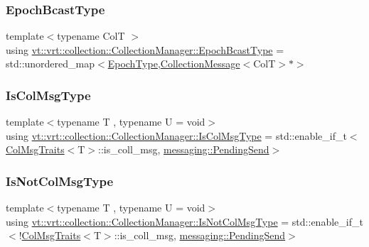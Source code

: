 \subsubsection{\texorpdfstring{Epoch\+Bcast\+Type}{EpochBcastType}}
{\footnotesize\ttfamily template$<$typename ColT $>$ \\
using \hyperlink{structvt_1_1vrt_1_1collection_1_1_collection_manager_ade4647c26f1f20016fa0520bea640f59}{vt\+::vrt\+::collection\+::\+Collection\+Manager\+::\+Epoch\+Bcast\+Type} =  std\+::unordered\+\_\+map$<$\hyperlink{namespacevt_a985a5adf291c34a3ca263b3378388236}{Epoch\+Type},\hyperlink{structvt_1_1vrt_1_1collection_1_1_collection_message}{Collection\+Message}$<$ColT$>$$\ast$$>$}

\mbox{\label{structvt_1_1vrt_1_1collection_1_1_collection_manager_a21c21612c806016788057aeab142af20}} 
\subsubsection{\texorpdfstring{Is\+Col\+Msg\+Type}{IsColMsgType}}
{\footnotesize\ttfamily template$<$typename T , typename U  = void$>$ \\
using \hyperlink{structvt_1_1vrt_1_1collection_1_1_collection_manager_a21c21612c806016788057aeab142af20}{vt\+::vrt\+::collection\+::\+Collection\+Manager\+::\+Is\+Col\+Msg\+Type} =  std\+::enable\+\_\+if\+\_\+t$<$\hyperlink{structvt_1_1vrt_1_1collection_1_1_col_msg_traits}{Col\+Msg\+Traits}$<$T$>$\+::is\+\_\+coll\+\_\+msg, \hyperlink{structvt_1_1messaging_1_1_pending_send}{messaging\+::\+Pending\+Send}$>$}

\mbox{\label{structvt_1_1vrt_1_1collection_1_1_collection_manager_ae376deeefd4f89a0b1c93849977715d9}} 
\subsubsection{\texorpdfstring{Is\+Not\+Col\+Msg\+Type}{IsNotColMsgType}}
{\footnotesize\ttfamily template$<$typename T , typename U  = void$>$ \\
using \hyperlink{structvt_1_1vrt_1_1collection_1_1_collection_manager_ae376deeefd4f89a0b1c93849977715d9}{vt\+::vrt\+::collection\+::\+Collection\+Manager\+::\+Is\+Not\+Col\+Msg\+Type} =  std\+::enable\+\_\+if\+\_\+t$<$!\hyperlink{structvt_1_1vrt_1_1collection_1_1_col_msg_traits}{Col\+Msg\+Traits}$<$T$>$\+::is\+\_\+coll\+\_\+msg, \hyperlink{structvt_1_1messaging_1_1_pending_send}{messaging\+::\+Pending\+Send}$>$}

